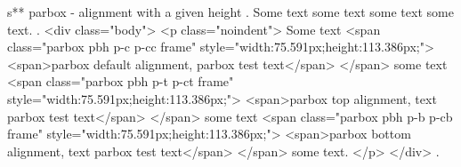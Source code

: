 s** parbox - alignment with a given height
.
\noindent
Some text
some text
some text
some text.
.
<div class="body">
<p class="noindent">
Some text <span class="parbox pbh p-c p-cc frame" style="width:75.591px;height:113.386px;">
<span>parbox default alignment, parbox test text</span>
</span> some text <span class="parbox pbh p-t p-ct frame" style="width:75.591px;height:113.386px;">
<span>parbox top alignment, text parbox test text</span>
</span> some text <span class="parbox pbh p-b p-cb frame" style="width:75.591px;height:113.386px;">
<span>parbox bottom alignment, text parbox test text</span>
</span> some text.
</p>
</div>
.

